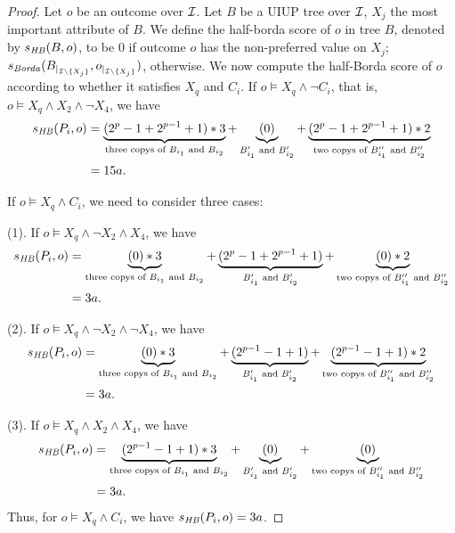 \begin{proof}
Let $o$ be an outcome over $\mathcal{I}$. 
Let $B$ be a UIUP tree over $\mathcal{I}$, $X_j$ the most important attribute of $B$.
We define the half-borda score of $o$ in tree $B$, denoted by $s_{\mathit{HB}}(B,o)$,
to be $0$ if outcome $o$ has the non-preferred value on $X_j$; 
$s_{\mathit{Borda}}(B_{|_{\mathcal{I}\backslash \{X_j\}}},o_{|_{\mathcal{I}\backslash \{X_j\}}})$, otherwise.
We now compute the half-Borda score of $o$ according to whether it satisfies
$X_q$ and $C_i$.
If $o \models X_q \land \neg C_i$, that is, $o \models X_q \land X_2 \land \neg X_4$, we have
\begin{align*}
	s_{\mathit{HB}}(P_i,o)&=\underbrace{(2^p-1+2^{p-1}+1)*3}_{\text{three copys of }B_{i_1}\text{ and }B_{i_2}}+
								  \underbrace{(0)}_{B'_{i_1}\text{ and }B'_{i_2}}+
									\underbrace{(2^p-1+2^{p-1}+1)*2}_{\text{two copys of }B''_{i_1}\text{ and }B''_{i_2}} \\
								&=15a.
\end{align*}

If $o \models X_q \land C_i$, we need to consider three cases:

(1). If $o \models X_q \land \neg X_2 \land X_4$, we have
\begin{align*}
	s_{\mathit{HB}}(P_i,o)&=\underbrace{(0)*3}_{\text{three copys of }B_{i_1}\text{ and }B_{i_2}}+
								  \underbrace{(2^p-1+2^{p-1}+1)}_{B'_{i_1}\text{ and }B'_{i_2}}+
									\underbrace{(0)*2}_{\text{two copys of }B''_{i_1}\text{ and }B''_{i_2}} \\
								&=3a.
\end{align*}

(2). If $o \models X_q \land \neg X_2 \land \neg X_4$, we have
\begin{align*}
	s_{\mathit{HB}}(P_i,o)&=\underbrace{(0)*3}_{\text{three copys of }B_{i_1}\text{ and }B_{i_2}}+
								  \underbrace{(2^{p-1}-1+1)}_{B'_{i_1}\text{ and }B'_{i_2}}+
									\underbrace{(2^{p-1}-1+1)*2}_{\text{two copys of }B''_{i_1}\text{ and }B''_{i_2}} \\
								&=3a.
\end{align*}

(3). If $o \models X_q \land X_2 \land X_4$, we have
\begin{align*}
	s_{\mathit{HB}}(P_i,o)&=\underbrace{(2^{p-1}-1+1)*3}_{\text{three copys of }B_{i_1}\text{ and }B_{i_2}}+
								  \underbrace{(0)}_{B'_{i_1}\text{ and }B'_{i_2}}+
									\underbrace{(0)}_{\text{two copys of }B''_{i_1}\text{ and }B''_{i_2}} \\
								&=3a.
\end{align*}
Thus, for $o \models X_q \land C_i$, we have $s_{\mathit{HB}}(P_i,o)=3a$.


\end{proof}

